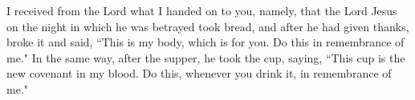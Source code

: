 \lettrine[lines=3]{I}{} received from the Lord what I handed on to you, namely, that the Lord Jesus on the night in which he was betrayed took bread, and after he had given thanks, broke it and said, ``This is my body, which is for you. Do this in remembrance of me." In the same way, after the supper, he took the cup, saying, ``This cup is the new covenant in my blood. Do this, whenever you drink it, in remembrance of me."
